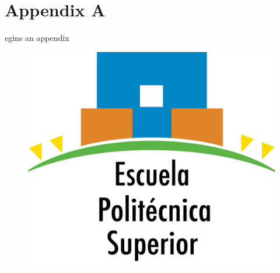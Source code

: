 
\chapter{Appendix A}
\label{app:app01}

egins an appendix

\begin{figure}[p]
\centering
\includegraphics[width=\textwidth]{logos/eps.jpg}
\label{dia:eps}
\end{figure}








\